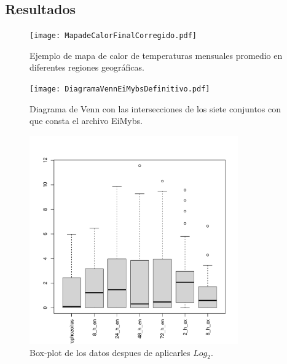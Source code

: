 \documentclass{article}
\begin{document}
\subsection{Resultados}
\begin{figure}[htbp]
  \centering
  \texttt{[image: MapadeCalorFinalCorregido.pdf]}
  \caption{Ejemplo de mapa de calor de temperaturas mensuales promedio en diferentes regiones geográficas.}
  \label{fig:heatmap_example}
\end{figure}


\begin{figure}[htbp]
  \centering
  \texttt{[image: DiagramaVennEiMybsDefinitivo.pdf]}
  \caption{Diagrama de Venn con las intersecciones de los siete conjuntos con que consta el archivo EiMybs.}
  \label{fig:heatmap_example}
\end{figure}


\begin{figure}[htbp]
  \centering
  \includegraphics[width=0.8\textwidth]{BoxPlotDatosTransformadosLog2.pdf}
  \caption{Box-plot de los datos despues de aplicarles $Log_{2}$.}
  \label{fig:heatmap_example}
\end{figure}
\end{document}

